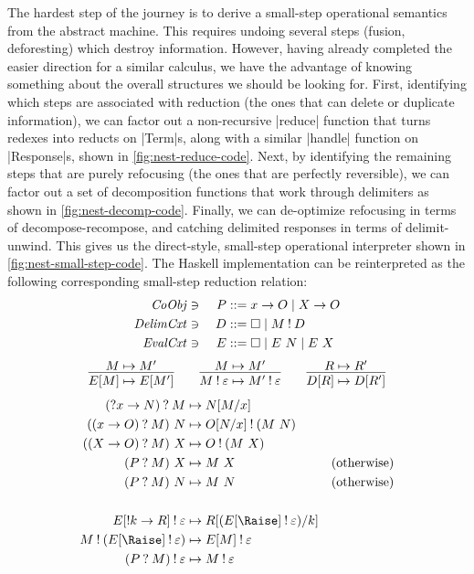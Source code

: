 \documentclass[sigplan,screen]{acmart}
\begin{document}
The hardest step of the journey is to derive a small-step operational semantics
from the abstract machine.  This requires undoing several steps (fusion,
deforesting) which destroy information.  However, having already completed the
easier direction for a similar calculus, we have the advantage of knowing
something about the overall structures we should be looking for.  First,
identifying which steps are associated with reduction (the ones that can delete
or duplicate information), we can factor out a non-recursive \hs|reduce|
function that turns redexes into reducts on \hs|Term|s, along with a similar
\hs|handle| function on \hs|Response|s, shown in \cref{fig:nest-reduce-code}.
Next, by identifying the remaining steps that are purely refocusing (the ones
that are perfectly reversible), we can factor out a set of decomposition
functions that work through delimiters as shown in \cref{fig:nest-decomp-code}.
Finally, we can de-optimize refocusing in terms of decompose-recompose, and
catching delimited responses in terms of delimit-unwind.  This gives us the
direct-style, small-step operational interpreter shown in
\cref{fig:nest-small-step-code}.  The Haskell implementation can be
reinterpreted as the following corresponding small-step reduction relation:
\begin{alignat*}{3}
  \mathit{CoObj} &\ni{}& P
  &::= x \to O
  \mid X \to O
  \\
  \mathit{DelimCxt} &\ni{}& D
  &::= \square
  \mid M \mathbin{!} D
  \\
  \mathit{EvalCxt} &\ni{}& E
  &::= \square
  \mid E ~ N
  \mid E ~ X
\end{alignat*}
\begin{gather*}
  \infer%
  {E[M] \mapsto E[M']}
  {M \mapsto M'}
  \qquad
  \infer%
  {M \ans \varepsilon \mapsto M' \ans \varepsilon}
  {M \mapsto M'}
  \qquad
  \infer%
  {D[R] \mapsto D[R']}
  {R \mapsto R'}
\end{gather*}
\begin{align*}
  (\ask x \to N) \ask M
  &\mapsto
  N\subst{x}{M}
  \\
  ((x \to O) \ask M) ~ N
  &\mapsto
  O\subst{x}{N} \ans (M ~ N)
  \\
  ((X \to O) \ask M) ~ X
  &\mapsto
  O \ans (M ~ X)
  \\
  (P \ask M) ~ X
  &\mapsto
  M ~ X
  &(\text{otherwise})
  \\
  (P \ask M) ~ N
  &\mapsto
  M ~ N
  &(\text{otherwise})
  \\\\
  E[\ans k \to R] \ans \varepsilon
  &\mapsto
  R\subst{k}{(E[\Raise] \ans \varepsilon)}
  \\
  M \ans (E[\Raise] \ans \varepsilon)
  &\mapsto
  E[M] \ans \varepsilon
  \\
  (P \ask M) \ans \varepsilon
  &\mapsto
  M \ans \varepsilon
\end{align*}
\end{document}
